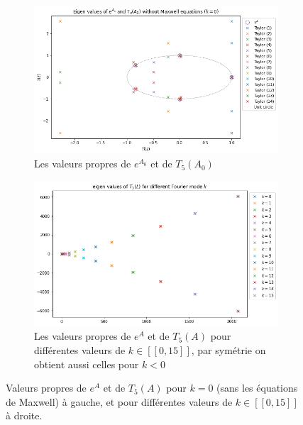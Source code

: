 \begin{figure}
  \begin{subfigure}{.5\textwidth}
    \centering
    \includegraphics[width=\textwidth]{img/approx_evA0T5.png}
    \caption{Les valeurs propres de $e^{A_0}$ et de $T_5(A_0)$}
  \end{subfigure}
  \begin{subfigure}{.5\textwidth}
    \centering
    \includegraphics[width=\textwidth]{img/approx_evAkT5.png}
    \caption{Les valeurs propres de $e^{A}$ et de $T_5(A)$ pour différentes valeurs de $k\in[\![0,15]\!]$, par symétrie on obtient aussi celles pour $k<0$}
  \end{subfigure}
  \caption{Valeurs propres de $e^{A}$ et de $T_5(A)$ pour $k=0$ (sans les équations de Maxwell) à gauche, et pour différentes valeurs de $k\in[\![0,15]\!]$ à droite.}
\end{figure}


